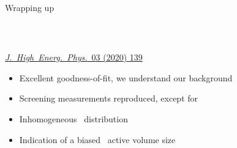 \documentclass[10pt,aspectratio=169]{beamer}
\begin{document}
\begin{frame}{Wrapping up}
  \begin{columns}
    \begin{column}{0.64\textwidth}
      \vspace*{-0.7cm} \\
      \begin{simpleblock}\centering
        \href{https://doi.org/10.1007/JHEP03(2020)139}{\emph{J.~High~Energ.~Phys.}~03 (2020) 139}
      \end{simpleblock}
      \begin{itemize}
        \item Excellent goodness-of-fit, \alert{we understand our background}
        \item Screening measurements reproduced, except for \kvn
        \item Inhomogeneous \kvz\ distribution
        \item Indication of a biased \bege\ active volume size
      \end{itemize}
    \end{column}
    \begin{column}{0.36\textwidth}
      \vspace*{1.6cm} \\
    \end{column}
  \end{columns}
\end{frame}
\end{document}
